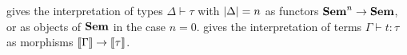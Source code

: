  gives the interpretation of types $\Delta \vdash \tau$ with $|\Delta|
= n$ as functors $\mathbf{Sem}^n \to \mathbf{Sem}$, or as objects of $\mathbf{Sem}$ in the case $n = 0$.
 gives the interpretation of terms $\Gamma \vdash t: \tau$ as morphisms
$\llbracket \Gamma \rrbracket \to \llbracket \tau \rrbracket$.

